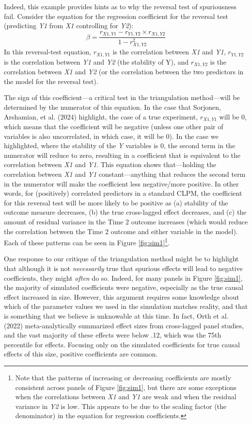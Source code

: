 \documentclass[
  man,floatsintext]{apa6}
\begin{document}
Indeed, this example provides hints as to why the reversal test of spuriousness fail. Consider the equation for the regression coefficient for the reversal test (predicting \emph{Y1} from \emph{X1} controlling for \emph{Y2}): \[\beta = \frac{r_{X1,Y1} - r_{Y1,Y2} \times r_{X1,Y2}} {1 - r_{X1,Y2}^{2}}\] In this reversal-test equation, \(r_{X1,Y1}\) is the correlation between \emph{X1} and \emph{Y1}, \(r_{Y1,Y2}\) is the correlation between \emph{Y1} and \emph{Y2} (the stability of Y), and \(r_{X1,Y2}\) is the correlation between \emph{X1} and \emph{Y2} (or the correlation between the two predictors in the model for the reversal test).

The sign of this coefficient---a critical test in the triangulation method---will be determined by the numerator of this equation. In the case that Sorjonen, Arshamian, et al. (2024) highlight, the case of a true experiment, \(r_{X1,Y1}\) will be 0, which means that the coefficient will be negative (unless one other pair of variables is also uncorrelated, in which case, it will be 0). In the case we highlighted, where the stability of the \emph{Y} variables is 0, the second term in the numerator will reduce to zero, resulting in a coefficient that is equivalent to the correlation between \emph{X1} and \emph{Y1}. This equation shows that---holding the correlation between \emph{X1} and \emph{Y1} constant---anything that reduces the second term in the numerator will make the coefficient less negative/more positive. In other words, for (positively) correlated predictors in a standard CLPM, the coefficient for this reversal test will be more likely to be positive as (a) stability of the outcome measure decreases, (b) the true cross-lagged effect decreases, and (c) the amount of residual variance in the Time 2 outcome increases (which would reduce the correlation between the Time 2 outcome and either variable in the model). Each of these patterns can be seen in Figure \ref{fig:sim1}\footnote{Note that the patterns of increasing or decreasing coefficients are mostly consistent across panels of Figure \ref{fig:sim1}, but there are some exceptions when the correlations between \emph{X1} and \emph{Y1} are weak and when the residual variance in \emph{Y2} is low. This appears to be due to the scaling factor (the denominator) in the equation for regression coefficients.}.

One response to our critique of the triangulation method might be to highlight that although it is not \emph{necessarily} true that spurious effects will lead to negative coefficients, they might \emph{often} do so. Indeed, for many panels in Figure \ref{fig:sim1}, the majority of simulated coefficients were negative, especially as the true causal effect increased in size. However, this argument requires some knowledge about which of the parameter values we used in the simulation matches reality, and that is something that we believe is unknowable at this time. In fact, Orth et al. (2022) meta-analytically summarized effect sizes from cross-lagged panel studies, and the vast majority of these effects were below .12, which was the 75th percentile for effects. Focusing only on the simulated coefficients for true causal effects of this size, positive coefficients are common.
\end{document}
